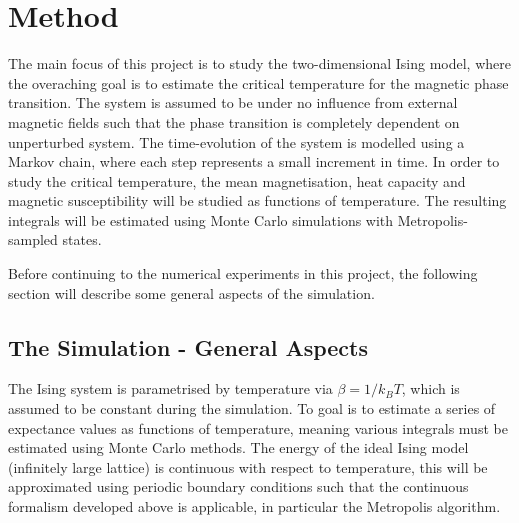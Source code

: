 \documentclass[nofootinbib,reprint,english]{revtex4-1}
\begin{document}
\section{Method}
The main focus of this project is to study the two-dimensional Ising model, where the overaching goal is to estimate the critical temperature for the magnetic phase transition. The system is assumed to be under no influence from external magnetic fields such that the phase transition is completely dependent on unperturbed system. The time-evolution of the system is modelled using a Markov chain, where each step represents a small increment in time. In order to study the critical temperature, the mean magnetisation, heat capacity and magnetic susceptibility will be studied as functions of temperature. The resulting integrals will be estimated using Monte Carlo simulations with Metropolis-sampled states.

Before continuing to the numerical experiments in this project, the following section will describe some general aspects of the simulation.
\subsection{The Simulation - General Aspects}
The Ising system is parametrised by temperature via \(\beta=1/k_BT\), which is assumed to be constant during the simulation. To goal is to estimate a series of expectance values as functions of temperature, meaning various integrals must be estimated using Monte Carlo methods. The energy of the ideal Ising model (infinitely large lattice) is continuous with respect to temperature, this will be approximated using periodic boundary conditions such that the continuous formalism developed above is applicable, in particular the Metropolis algorithm.
\end{document}

